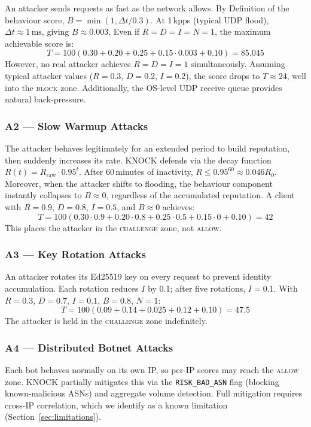 \documentclass[10pt,conference]{IEEEtran}
\begin{document}
An attacker sends requests as fast as the network allows.  By
Definition of the behaviour score, $B = \min(1, \Delta t / 0.3)$.
At 1\,kpps (typical UDP flood), $\Delta t \approx 1\,\mathrm{ms}$,
giving $B \approx 0.003$.  Even if $R = D = I = N = 1$, the maximum
achievable score is:
\[
  T = 100(0.30 + 0.20 + 0.25 + 0.15 \cdot 0.003 + 0.10) = 85.045
\]
However, no real attacker achieves $R = D = I = 1$ simultaneously.
Assuming typical attacker values ($R = 0.3$, $D = 0.2$, $I = 0.2$),
the score drops to $T \approx 24$, well into the \textsc{block} zone.
Additionally, the OS-level UDP receive queue provides natural back-pressure.

\subsubsection{A2 — Slow Warmup Attacks}

The attacker behaves legitimately for an extended period to build
reputation, then suddenly increases its rate.  KNOCK defends via the
decay function $R(t) = R_{\mathrm{raw}} \cdot 0.95^{t}$.  After
60\,minutes of inactivity, $R \leq 0.95^{60} \approx 0.046 R_0$.
Moreover, when the attacker shifts to flooding, the behaviour component
instantly collapses to $B \approx 0$, regardless of the accumulated
reputation.  A client with $R = 0.9$, $D = 0.8$, $I = 0.5$, and
$B \approx 0$ achieves:
\[
  T = 100(0.30 \cdot 0.9 + 0.20 \cdot 0.8 + 0.25 \cdot 0.5
         + 0.15 \cdot 0 + 0.10) = 42
\]
This places the attacker in the \textsc{challenge} zone, not \textsc{allow}.

\subsubsection{A3 — Key Rotation Attacks}

An attacker rotates its Ed25519 key on every request to prevent identity
accumulation.  Each rotation reduces $I$ by 0.1; after five rotations,
$I = 0.1$.  With $R = 0.3$, $D = 0.7$, $I = 0.1$, $B = 0.8$,
$N = 1$:
\[
  T = 100(0.09 + 0.14 + 0.025 + 0.12 + 0.10) = 47.5
\]
The attacker is held in the \textsc{challenge} zone indefinitely.

\subsubsection{A4 — Distributed Botnet Attacks}

Each bot behaves normally on its own IP, so per-IP scores may reach
the \textsc{allow} zone.  KNOCK partially mitigates this via the
\texttt{RISK\_BAD\_ASN} flag (blocking known-malicious ASNs) and
aggregate volume detection.  Full mitigation requires cross-IP
correlation, which we identify as a known limitation
(Section~\ref{sec:limitations}).
\end{document}
